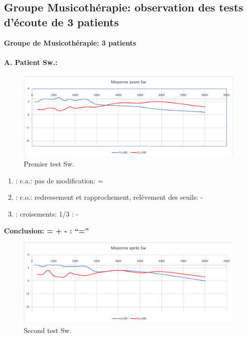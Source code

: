 \subsection{Groupe Musicothérapie: observation des tests d'écoute de 3 patients}
  \textbf{Groupe de Musicothérapie: 3 patients}

\paragraph{ A. Patient Sw.:}



 \begin{figure}[th]
\centering
\includegraphics[width=1\linewidth]{images/graphiques/sw_pre.png}
\caption[Moyenne OG+OD]{Premier test Sw.}

\end{figure}

	\begin{enumerate}

 		\item : c.a.: pas de modification: = %

 		\item : c.o.: redressement et rapprochement,
                  relèvement des seuils: -       %
 		\item : croisements: 1/3 :  -

                \end{enumerate}

                \textbf{  Conclusion:  = +  -        : ``=''}

                \begin{figure}[th]
\centering
\includegraphics[width=1\linewidth]{images/graphiques/sw_post.png}
\caption[Moyenne OG+OD]{Second test Sw.}

\end{figure}




